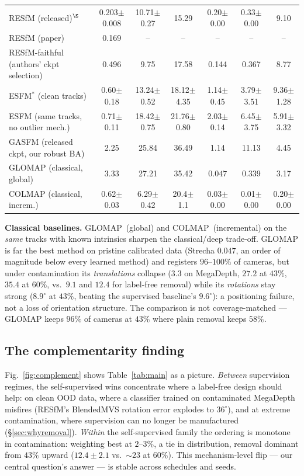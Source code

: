 \documentclass[10pt,twocolumn,letterpaper]{article}
\renewcommand{\deg}{^{\circ}}
\begin{document}
\begin{table}[t]
{\begin{tabular}{lcccccc}
\midrule
RESfM (released)$^{\S}$    & 0.203$\pm$0.008 & 10.71$\pm$0.27 & 15.29 & 0.20$\pm$0.00 & 0.33$\pm$0.00 & 9.10\\
RESfM (paper)               & 0.169 & -- & -- & -- & -- & --\\
RESfM-faithful (authors' ckpt selection) & 0.496 & 9.75 & 17.58 & 0.144 & 0.367 & 8.77\\
ESFM$^{\ast}$ (clean tracks) & 0.60$\pm$0.18 & 13.24$\pm$0.52 & 18.12$\pm$4.35 & 1.14$\pm$0.45 & 3.79$\pm$3.51 & 9.36$\pm$1.28\\
ESFM (same tracks, no outlier mech.) & 0.71$\pm$0.11 & 18.42$\pm$0.75 & 21.76$\pm$0.80 & 2.03$\pm$0.14 & 6.45$\pm$3.75 & 5.91$\pm$3.32\\
GASFM (released ckpt, our robust BA) & 2.25 & 25.84 & 36.49 & 1.14 & 11.13 & 4.45\\
GLOMAP (classical, global)  & 3.33 & 27.21 & 35.42 & $\mathbf{0.047}$ & 0.339 & 3.17\\
COLMAP (classical, increm.) & 0.62$\pm$0.03 & 6.29$\pm$0.42 & 20.4$\pm$1.1 & 0.03$\pm$0.00 & 0.01$\pm$0.00 & 0.20$\pm$0.00\\
\midrule
\bottomrule
\end{tabular}}
\end{table}


\noindent\textbf{Classical baselines.} GLOMAP~(global) and COLMAP~(incremental) on the
\emph{same} tracks with known intrinsics sharpen the classical/deep trade-off. GLOMAP is
far the best method on pristine calibrated data (Strecha $0.047$, an order of magnitude
below every learned method) and registers $96$--$100\%$ of cameras, but under
contamination its \emph{translations} collapse ($3.3$ on MegaDepth, $27.2$ at $43\%$,
$35.4$ at $60\%$, vs.\ $9.1$ and $12.4$ for label-free removal) while its
\emph{rotations} stay strong ($8.9\deg$ at $43\%$, beating the supervised baseline's
$9.6\deg$): a positioning failure, not a loss of orientation structure. The comparison
is not coverage-matched --- GLOMAP keeps $96\%$ of cameras at $43\%$ where plain removal
keeps $58\%$.

\subsection{The complementarity finding}
Fig.~\ref{fig:complement} shows Table~\ref{tab:main} as a picture. \emph{Between}
supervision regimes, the self-supervised wins concentrate where a label-free design
should help: on clean OOD data, where a classifier trained on contaminated MegaDepth
misfires (RESfM's BlendedMVS rotation error explodes to $36\deg$), and at extreme
contamination, where supervision can no longer be manufactured (\S\ref{sec:whyremoval}).
\emph{Within} the self-supervised family the ordering is monotone in contamination:
weighting best at $2$--$3\%$, a tie in distribution, removal dominant from $43\%$ upward
($12.4\pm2.1$ vs.\ $\sim\!23$ at $60\%$). This mechanism-level flip --- our central
question's answer --- is stable across schedules and seeds.
\end{document}
